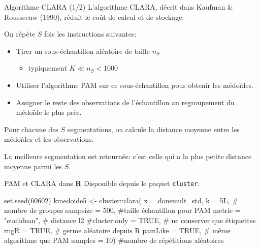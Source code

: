 \documentclass[
  ignorenonframetext,
]{beamer}
\newenvironment{Shaded}{\begin{snugshade}}{\end{snugshade}}
\newcommand{\AttributeTok}[1]{\textcolor[rgb]{0.40,0.45,0.13}{#1}}
\newcommand{\CommentTok}[1]{\textcolor[rgb]{0.37,0.37,0.37}{#1}}
\newcommand{\ConstantTok}[1]{\textcolor[rgb]{0.56,0.35,0.01}{#1}}
\newcommand{\DecValTok}[1]{\textcolor[rgb]{0.68,0.00,0.00}{#1}}
\newcommand{\FunctionTok}[1]{\textcolor[rgb]{0.28,0.35,0.67}{#1}}
\newcommand{\NormalTok}[1]{\textcolor[rgb]{0.00,0.23,0.31}{#1}}
\newcommand{\OtherTok}[1]{\textcolor[rgb]{0.00,0.23,0.31}{#1}}
\newcommand{\SpecialCharTok}[1]{\textcolor[rgb]{0.37,0.37,0.37}{#1}}
\newcommand{\StringTok}[1]{\textcolor[rgb]{0.13,0.47,0.30}{#1}}
\providecommand{\tightlist}{%
  \setlength{\itemsep}{0pt}\setlength{\parskip}{0pt}}\usepackage{longtable,booktabs,array}
\begin{document}
\begin{frame}{Algorithme CLARA (1/2)}
\protect\hypertarget{algorithme-clara-12}{}
L'algorithme CLARA, décrit dans Kaufman \& Rousseeuw (1990), réduit le
coût de calcul et de stockage.

On répète \(S\) fois les instructions suivantes:

\begin{itemize}
\tightlist
\item
  Tirer un sous-échantillon aléatoire de taille \(n_S\)

  \begin{itemize}
  \tightlist
  \item
    typiquement \(K \ll n_S < 1000\)
  \end{itemize}
\item
  Utiliser l'algorithme PAM sur ce sous-échantillon pour obtenir les
  médoïdes.
\item
  Assigner le reste des observations de l'échantillon au regroupement du
  médoïde le plus près.
\end{itemize}

Pour chacune des \(S\) segmentations, on calcule la distance moyenne
entre les médoïdes et les observations.

La meilleure segmentation est retournée: c'est celle qui a la plus
petite distance moyenne parmi les \(S\).
\end{frame}

\begin{frame}[fragile]{PAM et CLARA dans \textbf{R}}
\protect\hypertarget{pam-et-clara-dans-r}{}
Disponible depuis le paquet \texttt{cluster}.

\begin{Shaded}
\begin{Highlighting}[numbers=left,,]
\FunctionTok{set.seed}\NormalTok{(}\DecValTok{60602}\NormalTok{)}
\NormalTok{kmedoide5 }\OtherTok{\textless{}{-}}\NormalTok{ cluster}\SpecialCharTok{::}\FunctionTok{clara}\NormalTok{(}
   \AttributeTok{x =}\NormalTok{ donsmult\_std,}
   \AttributeTok{k =}\NormalTok{ 5L, }\CommentTok{\# nombre de groupes}
   \AttributeTok{sampsize =} \DecValTok{500}\NormalTok{, }\CommentTok{\#taille échantillon pour PAM}
   \AttributeTok{metric =} \StringTok{"euclidean"}\NormalTok{, }\CommentTok{\# distance l2}
   \CommentTok{\#cluster.only = TRUE, \# ne conserver que étiquettes}
   \AttributeTok{rngR =} \ConstantTok{TRUE}\NormalTok{, }\CommentTok{\# germe aléatoire depuis R}
   \AttributeTok{pamLike =} \ConstantTok{TRUE}\NormalTok{, }\CommentTok{\# même algorithme que PAM}
   \AttributeTok{samples =} \DecValTok{10}\NormalTok{) }\CommentTok{\#nombre de répétitions aléatoires}
\end{Highlighting}
\end{Shaded}
\end{frame}
\end{document}
